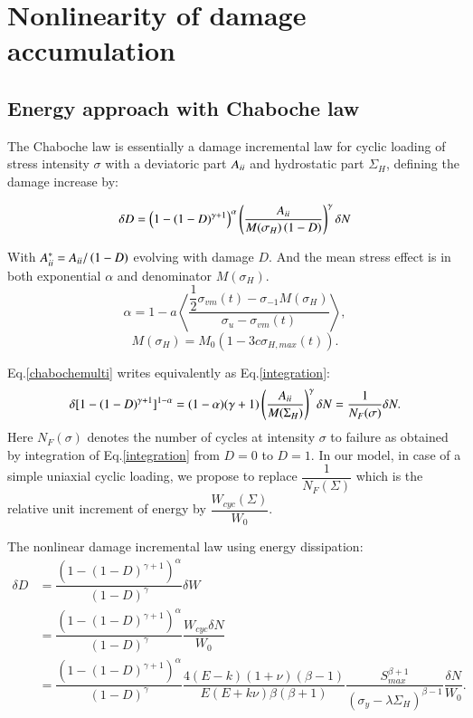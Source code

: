 \documentclass[3p,times,number,review]{elsarticle}
\begin{document}
\section{Nonlinearity of damage accumulation}
\subsection{Energy approach with Chaboche law}
The Chaboche law\cite{lemaitre1990mechanics} is essentially a damage incremental law for cyclic loading of stress intensity $\sigma$ with a deviatoric part ${A}_{\uppercase\expandafter{\romannumeral2}}$ and hydrostatic part $\Sigma_H$, defining the damage increase by:

 \begin{equation}\delta D = \left( 1 -(1-D)^{\gamma+1}\right)^\alpha \left(\frac{{A}_{\uppercase\expandafter{\romannumeral2}} }{M(\sigma_H)\left( 1-D\right)}\right)^\gamma \delta N
 \label{chabochemulti}
 \end{equation} 
 
With ${A}_{\uppercase\expandafter{\romannumeral2}}^*={A}_{\uppercase\expandafter{\romannumeral2}}/\left( 1-D\right) $ evolving with damage $D$. And the mean stress effect is in both exponential $\alpha$ and denominator $M(\sigma_H)$.
$$\alpha=1 - a\left\langle \dfrac{\dfrac{1}{2}\sigma_{vm}(t)-\sigma_{-1}M(\sigma_H) }{\sigma_{u} -\sigma_{vm}(t)}\right\rangle,$$
$$M(\sigma_H) =M_0 \left(1-3c\sigma_{H,max}(t) \right).$$
 
Eq.\eqref{chabochemulti} writes equivalently as Eq.\eqref{integration}:
   \begin{equation}\delta [1-(1-D)^{\gamma+1}]^{1-\alpha}=(1-\alpha)(\gamma+1)\left(\dfrac{{A}_{\uppercase\expandafter{\romannumeral2}} }{M(\Sigma_H)}\right)^\gamma \delta N=\dfrac{1}{N_F(\sigma)}\delta N.
   \label{integration}
   \end{equation}
Here $N_F(\sigma)$ denotes the number of cycles at intensity $\sigma$ to failure as obtained by integration of Eq.\eqref{integration} from $D=0$ to $D=1$. In our model, in case of a simple uniaxial cyclic loading, we propose to replace $\dfrac{1}{N_F(\Sigma)}$ which is the relative unit increment of energy by $\dfrac{W_{cyc}(\Sigma)}{W_0}$.



The nonlinear damage incremental law using energy dissipation:
\begin{equation}
\begin{split}
  \delta D &=\dfrac{\left( 1 -(1-D)^{\gamma+1}\right)^\alpha}{\left(1-D \right)^\gamma} \delta W
  \\&= \dfrac{\left( 1 -(1-D)^{\gamma+1}\right)^\alpha}{\left(1-D \right)^\gamma} \dfrac{W_{cyc}\delta N}{W_0}
  \\&= \dfrac{\left( 1 -(1-D)^{\gamma+1}\right)^\alpha}{\left(1-D \right)^\gamma} \dfrac{4(E-k)(1+\nu)\left( \beta-1\right) }{ E(E+k\nu)\beta\left( \beta+1\right) }\dfrac{S_{max}^{\beta+1}}{\left(\sigma_y-\lambda \Sigma_H\right)^{\beta-1}}\dfrac{\delta N}{W_0}.
\end{split}
\label{recoverchaboche}
\end{equation} 
\end{document}
